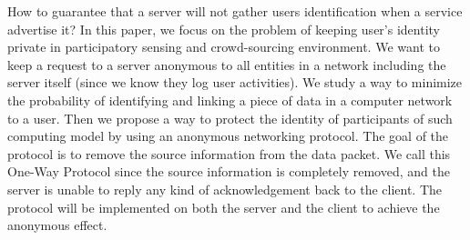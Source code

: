 How to guarantee that a server will not gather users identification when
a service advertise it? In this paper, we focus on the problem of keeping
user's identity private
in participatory sensing and crowd-sourcing environment. We want to keep
a request to a server anonymous to all entities in a network including
the server itself (since we know they log user activities).
We study a way to
minimize the probability of identifying and linking a piece of data
in a computer network to a user.
Then we propose a way to protect the identity of participants
of such computing model by using an anonymous networking protocol.
The goal of the protocol is to remove the source information from the data
packet. We call this One-Way Protocol since the source information is
completely removed, and the server is unable to reply any kind of
acknowledgement back to the client. The protocol will be implemented on
both the server and the client to achieve the anonymous effect.

